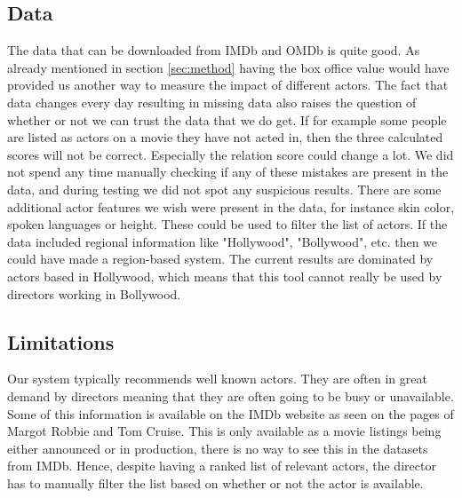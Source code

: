\subsection{Data}
The data that can be downloaded from IMDb and OMDb is quite good. As already mentioned in section \ref{sec:method} having the box office value would have provided us another way to measure the impact of different actors. The fact that data changes every day resulting in missing data also raises the question of whether or not we can trust the data that we do get. If for example some people are listed as actors on a movie they have not acted in, then the three calculated scores will not be correct. Especially the relation score could change a lot. We did not spend any time manually checking if any of these mistakes are present in the data, and during testing we did not spot any suspicious results. There are some additional actor features we wish were present in the data, for instance skin color, spoken languages or height. These could be used to filter the list of actors. If the data included regional information like "Hollywood", "Bollywood", etc. then we could have made a region-based system. The current results are dominated by actors based in Hollywood, which means that this tool cannot really be used by directors working in Bollywood.

\subsection{Limitations}
Our system typically recommends well known actors. They are often in great demand by directors meaning that they are often going to be busy or unavailable. Some of this information is available on the IMDb website as seen on the pages of Margot Robbie\cite{imdbMargot} and Tom Cruise\cite{imdbTom}. This is only available as a movie listings being either announced or in production, there is no way to see this in the datasets from IMDb. Hence, despite having a ranked list of relevant actors, the director has to manually filter the list based on whether or not the actor is available. 